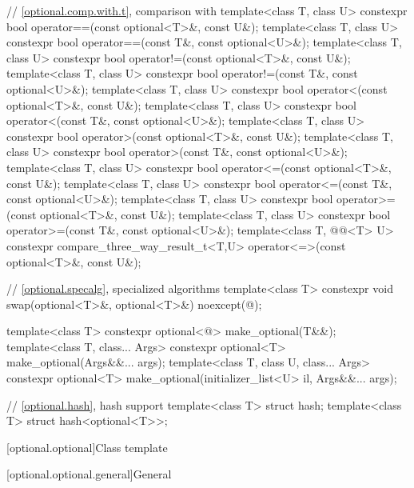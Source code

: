\begin{codeblock}
{  // \ref{optional.comp.with.t}, comparison with 
  template<class T, class U> constexpr bool operator==(const optional<T>&, const U&);
  template<class T, class U> constexpr bool operator==(const T&, const optional<U>&);
  template<class T, class U> constexpr bool operator!=(const optional<T>&, const U&);
  template<class T, class U> constexpr bool operator!=(const T&, const optional<U>&);
  template<class T, class U> constexpr bool operator<(const optional<T>&, const U&);
  template<class T, class U> constexpr bool operator<(const T&, const optional<U>&);
  template<class T, class U> constexpr bool operator>(const optional<T>&, const U&);
  template<class T, class U> constexpr bool operator>(const T&, const optional<U>&);
  template<class T, class U> constexpr bool operator<=(const optional<T>&, const U&);
  template<class T, class U> constexpr bool operator<=(const T&, const optional<U>&);
  template<class T, class U> constexpr bool operator>=(const optional<T>&, const U&);
  template<class T, class U> constexpr bool operator>=(const T&, const optional<U>&);
  template<class T, @@<T> U>
    constexpr compare_three_way_result_t<T,U>
      operator<=>(const optional<T>&, const U&);

  // \ref{optional.specalg}, specialized algorithms
  template<class T>
    constexpr void swap(optional<T>&, optional<T>&) noexcept(@\seebelow@);

  template<class T>
    constexpr optional<@\seebelow@> make_optional(T&&);
  template<class T, class... Args>
    constexpr optional<T> make_optional(Args&&... args);
  template<class T, class U, class... Args>
    constexpr optional<T> make_optional(initializer_list<U> il, Args&&... args);

  // \ref{optional.hash}, hash support
  template<class T> struct hash;
  template<class T> struct hash<optional<T>>;
}
\end{codeblock}

[optional.optional]{Class template }

[optional.optional.general]{General}

